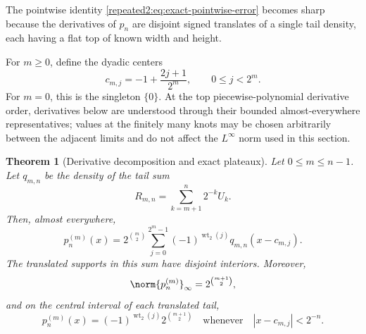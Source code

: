 \documentclass[11pt,oneside]{article}
\newtheorem{theorem}{Theorem}[section]
\theoremstyle{definition}
\theoremstyle{remark}
\newcommand{\wt}{\operatorname{wt}_2}
\begin{document}
The pointwise identity \eqref{repeated2:eq:exact-pointwise-error} becomes sharp because the derivatives
of $p_n$ are disjoint signed translates of a single tail density, each having a flat top of
known width and height.

For $m\ge0$, define the dyadic centers
\begin{equation}
 c_{m,j}=-1+\frac{2j+1}{2^m},
 \qquad 0\le j<2^m.
 \label{repeated2:eq:cmj-definition}
\end{equation}
For $m=0$, this is the singleton $\{0\}$.  At the top piecewise-polynomial derivative
order, derivatives below are understood through their bounded almost-everywhere
representatives; values at the finitely many knots may be chosen arbitrarily between the
adjacent limits and do not affect the $L^\infty$ norm used in this section.

\begin{theorem}[Derivative decomposition and exact plateaux]
\label{repeated2:thm:partial-derivative-geometry}
Let $0\le m\le n-1$.  Let $q_{m,n}$ be the density of the tail sum
\begin{equation}
 R_{m,n}=\sum_{k=m+1}^{n}2^{-k}U_k.
 \label{repeated2:eq:Rmn}
\end{equation}
Then, almost everywhere,
\begin{equation}
 p_n^{(m)}(x)=2^{\binom m2}
 \sum_{j=0}^{2^m-1}(-1)^{\wt(j)}q_{m,n}(x-c_{m,j}).
 \label{repeated2:eq:pnm-decomposition}
\end{equation}
The translated supports in this sum have disjoint interiors.  Moreover,
\begin{equation}
 \norm{p_n^{(m)}}_\infty=2^{\binom{m+1}{2}},
 \label{repeated2:eq:pnm-norm}
\end{equation}
and on the central interval of each translated tail,
\begin{equation}
 p_n^{(m)}(x)=(-1)^{\wt(j)}2^{\binom{m+1}{2}}
 \quad\text{whenever}\quad |x-c_{m,j}|<2^{-n}.
 \label{repeated2:eq:pnm-plateau}
\end{equation}
\end{theorem}
\end{document}
